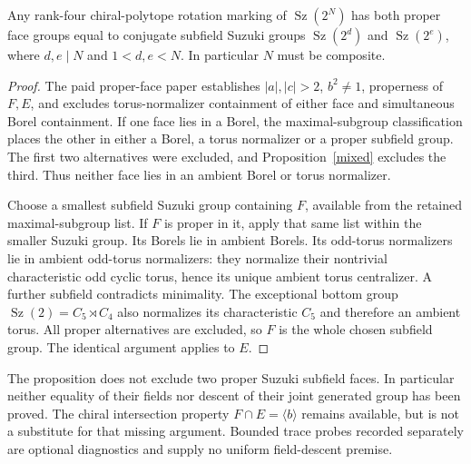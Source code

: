 \documentclass[11pt,a4paper]{article}
\newcommand{\Sz}{\operatorname{Sz}}\newcommand{\gen}[1]{\langle#1\rangle}
\begin{document}
\begin{proposition}\label{remaining}
Any rank-four chiral-polytope rotation marking of $\Sz(2^N)$ has
both proper face groups equal to conjugate subfield Suzuki groups
$\Sz(2^d)$ and $\Sz(2^e)$, where $d,e\mid N$ and
$1<d,e<N$. In particular $N$ must be composite.
\end{proposition}
\begin{proof}
The paid proper-face paper establishes $|a|,|c|>2$, $b^2\ne1$,
properness of $F,E$, and excludes torus-normalizer containment of either
face and simultaneous Borel containment. If one face lies in a Borel,
the maximal-subgroup classification places the other in either a Borel,
a torus normalizer or a proper subfield group. The first two alternatives
were excluded, and Proposition~\ref{mixed} excludes the third. Thus
neither face lies in an ambient Borel or torus normalizer.

Choose a smallest subfield Suzuki group containing $F$, available from
the retained maximal-subgroup list. If $F$ is proper in it, apply that
same list within the smaller Suzuki group. Its Borels lie in ambient
Borels. Its odd-torus normalizers lie in ambient odd-torus normalizers:
they normalize their nontrivial characteristic odd cyclic torus, hence
its unique ambient torus centralizer. A further subfield contradicts
minimality. The exceptional bottom group $\Sz(2)=C_5\rtimes C_4$
also normalizes its characteristic $C_5$ and therefore an ambient torus.
All proper alternatives are excluded, so $F$ is the whole chosen
subfield group. The identical argument applies to $E$.
\end{proof}

The proposition does not exclude two proper Suzuki subfield faces. In
particular neither equality of their fields nor descent of their joint
generated group has been proved. The chiral intersection property
$F\cap E=\gen b$ remains available, but is not a substitute for that
missing argument. Bounded trace probes recorded separately are optional
diagnostics and supply no uniform field-descent premise.
\end{document}
